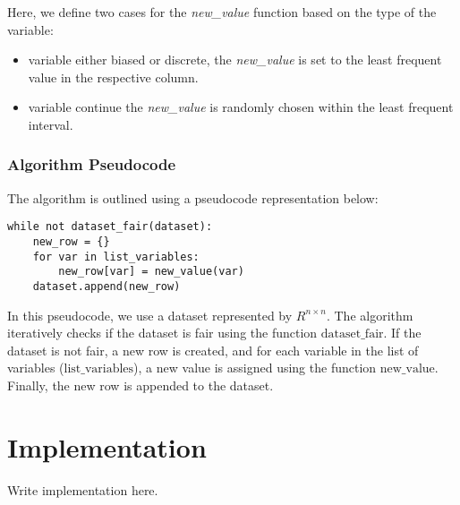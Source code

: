 \documentclass[12pt,a4paper,openright,twoside]{book}
\begin{document}
Here, we define two cases for the \textit{new\_value} function based on the type of the variable:
\begin{itemize}
    \item variable either biased or discrete, the \textit{new\_value} is set to the least frequent value in the respective column.
    \item variable continue the \textit{new\_value} is randomly chosen within the least frequent interval.
\end{itemize}

\subsection{Algorithm Pseudocode}

The algorithm is outlined using a pseudocode representation below:

\begin{verbatim}
while not dataset_fair(dataset):
    new_row = {}
    for var in list_variables:
        new_row[var] = new_value(var)
    dataset.append(new_row)
\end{verbatim}

In this pseudocode, we use a dataset represented by \( R^{n \times n} \). The algorithm iteratively checks if the dataset is fair using the function \( \text{dataset\_fair} \). If the dataset is not fair, a new row is created, and for each variable in the list of variables (\( \text{list\_variables} \)), a new value is assigned using the function \( \text{new\_value} \). Finally, the new row is appended to the dataset.


%
%

\chapter{Implementation} %
\label{chap:implementation}

Write implementation here.


\end{document}
